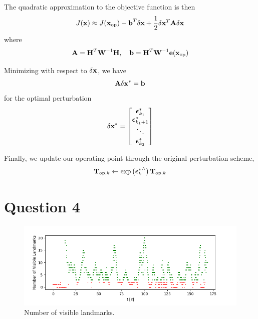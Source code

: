 \documentclass[a4paper]{article}
\begin{document}
The quadratic approximation to the objective function is then
\begin{equation}
    J(\bm{\mathbf{x}}) \approx J(\bm{\mathbf{x}}_{\text{op}}) - \bm{\mathbf{b}}^T \delta \bm{\mathbf{x}} + \dfrac{1}{2} \delta \bm{\mathbf{x}}^T \bm{\mathbf{A}} \delta \bm{\mathbf{x}}
\end{equation}
where
\begin{equation}
    \bm{\mathbf{A}} = \bm{\mathbf{H}}^T \bm{\mathbf{W}}^{-1}\bm{\mathbf{H}}, \quad \bm{\mathbf{b}} = \bm{\mathbf{H}}^T \bm{\mathbf{W}}^{-1} \bm{\mathbf{e}}(\bm{\mathbf{x}}_{\text{op}})
\end{equation}

Minimizing with respect to $\delta \bm{\mathbf{x}}$, we have 
\begin{equation}
    \bm{\mathbf{A}} \delta \bm{\mathbf{x}}^* = \bm{\mathbf{b}}
\end{equation}
for the optimal perturbation
\begin{equation}
    \delta \bm{\mathbf{x}}^* = \begin{bmatrix}
      \bm{\mathbf{\epsilon}}_{k_1}^* \\ \bm{\mathbf{\epsilon}}_{k_1+1}^* \\ \ddots \\ \bm{\mathbf{\epsilon}}_{k_2}^*
    \end{bmatrix}
\end{equation}

Finally, we update our operating point through the original perturbation scheme,
\begin{equation}
    \bm{\mathbf{T}}_{\text{op}, k} \leftarrow \exp\left( {\bm{\mathbf{\epsilon}}_k^*}^{\wedge} \right) \bm{\mathbf{T}}_{\text{op}, k}
\end{equation}

\section*{Question 4}

\begin{figure}[H]
    \centering
    \includegraphics[width=\textwidth]{code/num_visible.png}
    \caption{Number of visible landmarks.}
    \label{fig:4}
\end{figure}
\end{document}
